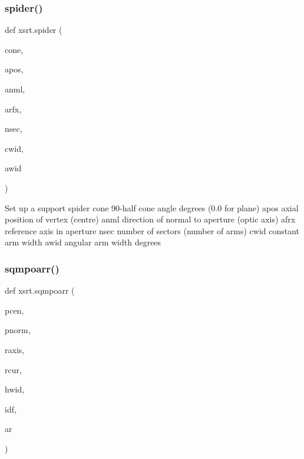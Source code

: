 \subsubsection{\texorpdfstring{spider()}{spider()}}
{\footnotesize\ttfamily def xsrt.\+spider (\begin{DoxyParamCaption}\item[{}]{cone,  }\item[{}]{apos,  }\item[{}]{anml,  }\item[{}]{arfx,  }\item[{}]{nsec,  }\item[{}]{cwid,  }\item[{}]{awid }\end{DoxyParamCaption})}

\begin{DoxyVerb}Set up a support spider
    cone        90-half cone angle degrees (0.0 for plane)
    apos        axial position of vertex (centre)
    anml        direction of normal to aperture (optic axis)
    afrx        reference axis in aperture
    nsec        number of sectors (number of arms)
    cwid        constant arm width
    awid        angular arm width degrees
\end{DoxyVerb}
 \mbox{\label{namespacexsrt_a1b936cb04c912480f996a2338f00f165}} 
\subsubsection{\texorpdfstring{sqmpoarr()}{sqmpoarr()}}
{\footnotesize\ttfamily def xsrt.\+sqmpoarr (\begin{DoxyParamCaption}\item[{}]{pcen,  }\item[{}]{pnorm,  }\item[{}]{raxis,  }\item[{}]{rcur,  }\item[{}]{hwid,  }\item[{}]{idf,  }\item[{}]{ar }\end{DoxyParamCaption})}

